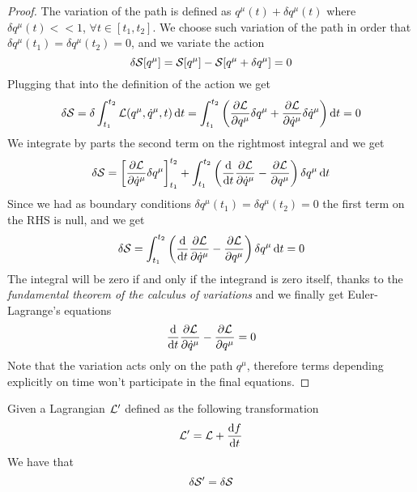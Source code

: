 \documentclass[../admech.tex]{subfiles}
\begin{document}
\begin{proof}
	The variation of the path is defined as $q^\mu(t)+\delta q^\mu(t)$ where $\delta q^\mu(t)<<1$, $\forall t\in[t_1,t_2]$. We choose such variation of the path in order that $\delta q^\mu(t_1)=\delta q^\mu(t_2)=0$, and we variate the action
	\begin{equation*}
		\delta\mathcal{S}[q^\mu]=\mathcal{S}[q^\mu]-\mathcal{S}[q^\mu+\delta q^\mu]=0
	\end{equation*}
	Plugging that into the definition of the action we get
	\begin{equation}
		\delta\mathcal{S}=\delta\int_{t_1}^{t_2}\mathcal{L}(q^\mu,\dot{q}^\mu,t)\dd{t}=\int_{t_1}^{t_2}\left( \pdv{\mathcal{L}}{q^\mu}\delta q^\mu+\pdv{\mathcal{L}}{\dot{q}^\mu}\delta\dot{q}^\mu \right)\dd{t}=0
		\label{eq:varint}
	\end{equation}
	We integrate by parts the second term on the rightmost integral and we get
	\begin{equation*}
		\delta\mathcal{S}=\left[ \pdv{\mathcal{L}}{\dot{q}^\mu}\delta q^\mu \right]_{t_1}^{t_2}+\int_{t_1}^{t_2}\left( \dv{t}\pdv{\mathcal{L}}{\dot{q}^\mu}-\pdv{\mathcal{L}}{q^\mu} \right)\delta q^\mu\dd{t}
	\end{equation*}
	Since we had as boundary conditions $\delta q^\mu(t_1)=\delta q^\mu(t_2)=0$ the first term on the RHS is null, and we get
	\begin{equation}
		\delta\mathcal{S}=\int_{t_1}^{t_2}\left( \dv{t}\pdv{\mathcal{L}}{\dot{q}^\mu}-\pdv{\mathcal{L}}{q^\mu} \right)\delta q^\mu\dd{t}=0
		\label{eq:variationfinal}
	\end{equation}
	The integral will be zero if and only if the integrand is zero itself, thanks to the \emph{fundamental theorem of the calculus of variations} and we finally get Euler-Lagrange's equations
	\begin{equation}
		\dv{t}\pdv{\mathcal{L}}{\dot{q}^\mu}-\pdv{\mathcal{L}}{q^\mu}=0
		\label{eq:eulerlagrangevar}
	\end{equation}
	Note that the variation acts only on the path $q^\mu$, therefore terms depending explicitly on time won't participate in the final equations.
\end{proof}
\begin{thm}
	Given a Lagrangian $\mathcal{L}'$ defined as the following transformation
	\begin{equation*}
		\mathcal{L}'=\mathcal{L}+\dv{f}{t}
	\end{equation*}
	We have that
	\begin{equation}
		\delta\mathcal{S}'=\delta\mathcal{S}
		\label{eq:invartotd}
	\end{equation}
\end{thm}
\end{document}
